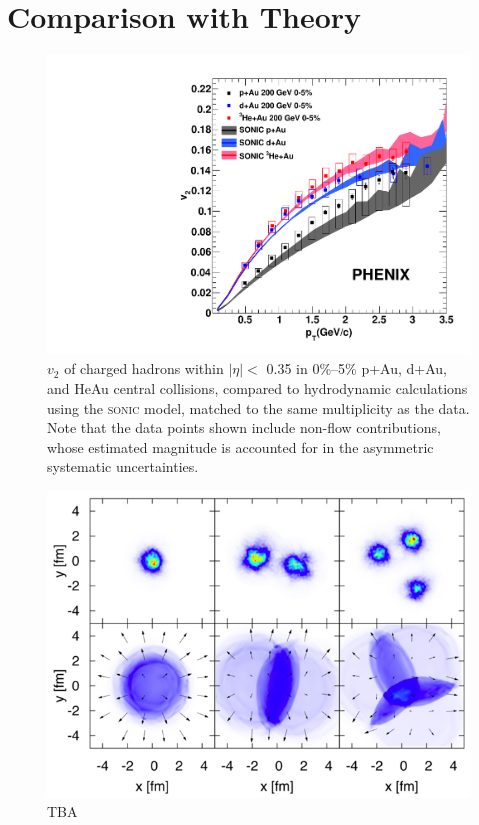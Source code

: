 \section{Comparison with Theory}
\begin{figure}
\begin{center}
\includegraphics[width=0.5\linewidth]{figs/three_system_comparison_result.pdf}
\caption{$v_2$ of charged hadrons within $|\eta| <$ 0.35 in 0\%--5\% p+Au, d+Au, and HeAu central collisions, compared to hydrodynamic calculations using the \textsc{sonic} model, matched to the same multiplicity as the data. Note that the data points shown include non-flow contributions, whose estimated magnitude is accounted for in the asymmetric systematic uncertainties.}
\label{fig:all_system_hydro}
\end{center}
\end{figure}
\begin{figure}
\begin{center}
\includegraphics[width=0.75\linewidth]{figs/initial_condition_comparison.png}
\caption{TBA}
\label{fig:initial_condition_comparison}
\end{center}
\end{figure}

